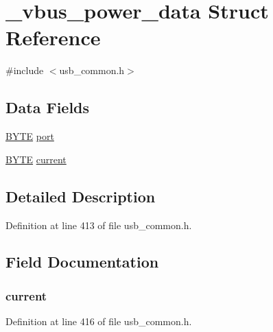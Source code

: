 \hypertarget{struct__vbus__power__data}{}\section{\+\_\+vbus\+\_\+power\+\_\+data Struct Reference}
\label{struct__vbus__power__data}


{\ttfamily \#include $<$usb\+\_\+common.\+h$>$}

\subsection*{Data Fields}
\begin{DoxyCompactItemize}
\item 
\hyperlink{_generic_type_defs_8h_a4ae1dab0fb4b072a66584546209e7d58}{B\+Y\+T\+E} \hyperlink{struct__vbus__power__data_a5e8703ab09ab1691cae59ecf39a7071b}{port}
\item 
\hyperlink{_generic_type_defs_8h_a4ae1dab0fb4b072a66584546209e7d58}{B\+Y\+T\+E} \hyperlink{struct__vbus__power__data_a1b4ec4fa96056492435097f010f6dcd3}{current}
\end{DoxyCompactItemize}


\subsection{Detailed Description}


Definition at line 413 of file usb\+\_\+common.\+h.



\subsection{Field Documentation}
\hypertarget{struct__vbus__power__data_a1b4ec4fa96056492435097f010f6dcd3}{}
\subsubsection[{current}]{ current}\label{struct__vbus__power__data_a1b4ec4fa96056492435097f010f6dcd3}


Definition at line 416 of file usb\+\_\+common.\+h.

\hypertarget{struct__vbus__power__data_a5e8703ab09ab1691cae59ecf39a7071b}{}
